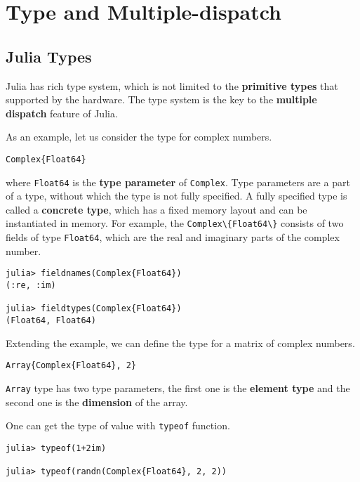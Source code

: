 \documentclass[
  notoc %
]{tufte-book}
\newcommand{\passthrough}[1]{#1}
\begin{document}
\hypertarget{type-and-multiple-dispatch}{%
\section{Type and Multiple-dispatch}\label{type-and-multiple-dispatch}}

\hypertarget{julia-types}{%
\subsection{Julia Types}\label{julia-types}}

Julia has rich type system, which is not limited to the
\textbf{primitive types} that supported by the hardware. The type system
is the key to the \textbf{multiple dispatch} feature of Julia.

As an example, let us consider the type for complex numbers.

\begin{lstlisting}
Complex{Float64}
\end{lstlisting}

where \passthrough{\lstinline!Float64!} is the \textbf{type parameter}
of \passthrough{\lstinline!Complex!}. Type parameters are a part of a
type, without which the type is not fully specified. A fully specified
type is called a \textbf{concrete type}, which has a fixed memory layout
and can be instantiated in memory. For example, the
\passthrough{\lstinline!Complex\{Float64\}!} consists of two fields of
type \passthrough{\lstinline!Float64!}, which are the real and imaginary
parts of the complex number.

\begin{lstlisting}
julia> fieldnames(Complex{Float64})
(:re, :im)

julia> fieldtypes(Complex{Float64})
(Float64, Float64)
\end{lstlisting}

Extending the example, we can define the type for a matrix of complex
numbers.

\begin{lstlisting}
Array{Complex{Float64}, 2}
\end{lstlisting}

\passthrough{\lstinline!Array!} type has two type parameters, the first
one is the \textbf{element type} and the second one is the
\textbf{dimension} of the array.

One can get the type of value with \passthrough{\lstinline!typeof!}
function.

\begin{lstlisting}
julia> typeof(1+2im)

julia> typeof(randn(Complex{Float64}, 2, 2))
\end{lstlisting}
\end{document}
